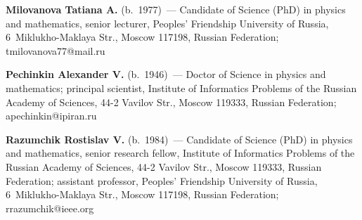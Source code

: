 \vspace*{3pt}



\noindent
\textbf{Milovanova Tatiana A.} (b.\ 1977)~---
Candidate of Science (PhD) in physics and
mathematics, senior lecturer,
Peoples' Friendship University of Russia,
6~Miklukho-Maklaya Str., Moscow 117198, Russian Federation;
tmilovanova77@mail.ru


\vspace*{3pt}

\noindent
\textbf{Pechinkin Alexander V.} (b.\ 1946)~--- Doctor
of Science in physics and mathematics; principal
scientist, Institute of Informatics Problems of
the Russian Academy of Sciences, 44-2 Vavilov Str.,
Moscow 119333, Russian Federation; apechinkin@ipiran.ru


\vspace*{3pt}

\noindent
\textbf{Razumchik Rostislav V.} (b.\ 1984)~--- Candidate
of Science (PhD) in physics and mathematics,
senior research fellow, Institute of Informatics
Problems of the Russian Academy of Sciences, 44-2 Vavilov Str.,
Moscow 119333, Russian Federation;
assistant professor,
Peoples' Friendship University of Russia,
6~Miklukho-Maklaya Str., Moscow 117198, Russian Federation;
rrazumchik@ieee.org


\label{end\stat}

\renewcommand{\bibname}{\protect\rm Литература}